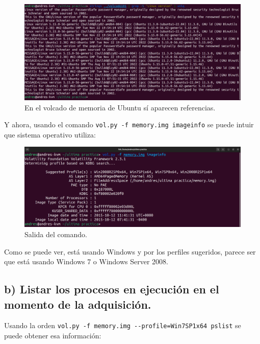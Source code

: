 \documentclass{article}
\begin{document}
\begin{figure}[H]
    \centering
    \includegraphics[width=\textwidth]{imagenes/Captura desde 2022-12-06 12-56-51-linux.png}
    \caption{En el volcado de memoria de Ubuntu sí aparecen referencias.}
\end{figure}


Y ahora, usando el comando \verb|vol.py -f memory.img imageinfo| se puede intuir que sistema operativo utiliza:

\begin{figure}[H]
    \centering
    \includegraphics[width=\textwidth]{imagenes/Captura desde 2022-12-06 12-36-39.png}
    \caption{Salida del comando.}
\end{figure}

Como se puede ver, está usando Windows y por los perfiles sugeridos, parece ser que está usando Windows 7 o Windows Server 2008.

\subsection{b) Listar los procesos en ejecución en el momento de la adquisición.}

Usando la orden \verb|vol.py -f memory.img --profile=Win7SP1x64 pslist| se puede obtener esa información:
\end{document}
